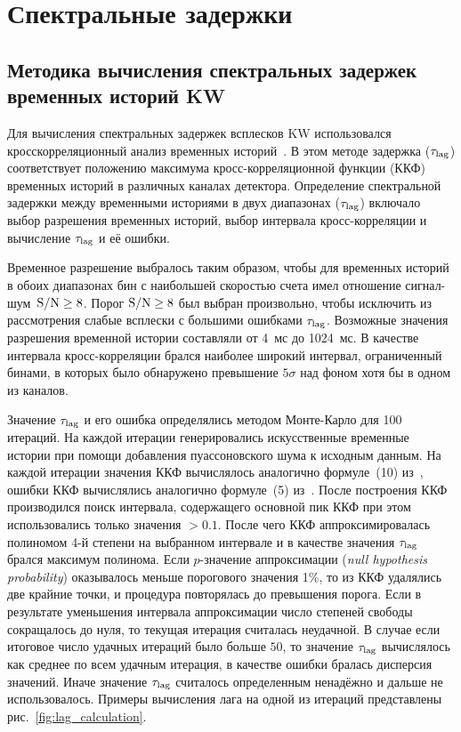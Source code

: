 \FloatBarrier

\section{Спектральные задержки}\label{sec:Lags}

\subsection{Методика вычисления спектральных задержек временных историй KW}
Для вычисления спектральных задержек всплесков KW использовался 
кросскорреляционный анализ временных историй~\citep{Band_1997ApJ, Norris_2000}. 
В этом методе задержка ($\tau_{\mathrm{lag}}$) соответствует положению максимума 
кросс-корреляционной функции (ККФ) временных историй в различных каналах детектора.
Определение спектральной задержки между временными историями в двух диапазонах ($\tau_{\mathrm{lag}}$) 
включало выбор разрешения временных историй, выбор интервала кросс-корреляции 
и вычисление $\tau_{\mathrm{lag}}$ и её ошибки. 

Временное разрешение выбралось таким образом, чтобы для временных историй 
в обоих диапазонах бин с наибольшей скоростью счета имел отношение сигнал-шум~${\mathrm{S/N}} \geq 8$. 
Порог ${\mathrm{S/N}} \geq 8$ был выбран произвольно, чтобы исключить из рассмотрения 
слабые всплески с большими ошибками $\tau_{\mathrm{lag}}$. Возможные значения разрешения 
временной истории составляли от 4~мс до 1024~мс.
В качестве интервала кросс-корреляции брался наиболее широкий интервал, ограниченный
бинами, в которых было обнаружено превышение $5\sigma$ над фоном хотя бы в одном из каналов. 

Значение  $\tau_{\mathrm{lag}}$ и его ошибка определялись методом Монте-Карло для 100 итераций. 
На каждой итерации генерировались искусственные временные истории 
при помощи добавления пуассоновского шума к исходным данным.
На каждой итерации значения ККФ вычислялось аналогично формуле~(10) из~\citep{Band_1997ApJ}, 
ошибки ККФ вычислялись аналогично формуле~(5) из~\citep{Fenimore_1995}.
После построения ККФ производился поиск интервала, содержащего основной пик ККФ
при этом использовались только значения $>0.1$.  
После чего ККФ аппроксимировалась полиномом 4-й степени на выбранном интервале
и в качестве значения $\tau_{\mathrm{lag}}$ брался максимум полинома.
Если $p$-значение аппроксимации (\textit{null hypothesis probability}) 
оказывалось меньше порогового значения 1\%, 
то из ККФ удалялись две крайние точки, и процедура повторялась до превышения порога. 
Если в результате уменьшения интервала аппроксимации число степеней свободы сокращалось до нуля,
то текущая итерация считалась неудачной. 
В случае если итоговое число удачных итераций было больше $50$, то значение $\tau_{\mathrm{lag}}$ 
вычислялось как среднее по всем удачным итерация, в качестве ошибки бралась дисперсия значений.
Иначе значение $\tau_{\mathrm{lag}}$ считалось определенным ненадёжно и дальше не использовалось.
Примеры вычисления лага на одной из итераций представлены рис.~\ref{fig:lag_calculation}.

